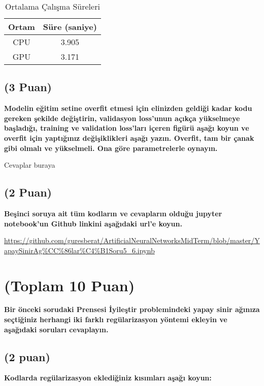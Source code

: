 \documentclass[11pt]{article}
\begin{document}
\begin{table}[ht!]
    \centering
    \caption{Ortalama Çalışma Süreleri}
    \begin{tabular}{c|c}
        Ortam & Süre (saniye) \\\hline
        CPU & 3.905 \\
        GPU & 3.171\\
    \end{tabular}
    \label{tab:my_table}
\end{table}

\subsection{(3 Puan)} \textbf{Modelin eğitim setine overfit etmesi için elinizden geldiği kadar kodu gereken şekilde değiştirin, validasyon loss'unun açıkça yükselmeye başladığı, training ve validation loss'ları içeren figürü aşağı koyun ve overfit için yaptığınız değişiklikleri aşağı yazın. Overfit, tam bir çanak gibi olmalı ve yükselmeli. Ona göre parametrelerle oynayın.}

Cevaplar buraya

\begin{comment}
\begin{figure}[ht!]
    \centering
    \texttt{[image: mypicturehere.png]}
    \caption{Buraya açıklama yazın}
    \label{fig:my_pic}
\end{figure}
\end{comment}

\subsection{(2 Puan)} \textbf{Beşinci soruya ait tüm kodların ve cevapların olduğu jupyter notebook'un Github linkini aşağıdaki url'e koyun.}

\url{https://github.com/guresberat/ArtificialNeuralNetworksMidTerm/blob/master/YapaySinirAg%CC%86lar%C4%B1Soru5_6.ipynb}

\section{(Toplam 10 Puan)} \textbf{Bir önceki sorudaki Prensesi İyileştir problemindeki yapay sinir ağınıza seçtiğiniz herhangi iki farklı regülarizasyon yöntemi ekleyin ve aşağıdaki soruları cevaplayın.} 

\subsection{(2 puan)} \textbf{Kodlarda regülarizasyon eklediğiniz kısımları aşağı koyun:} 
\end{document}
